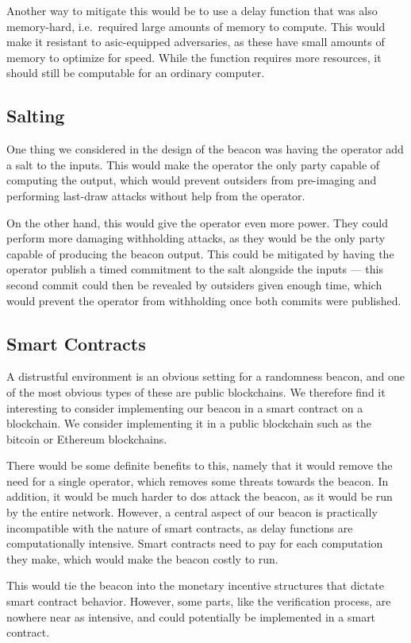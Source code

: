 Another way to mitigate this would be to use a delay function that was also memory-hard, i.e.\ required large amounts of memory to compute.
This would make it resistant to \gls{asic}-equipped adversaries, as these have small amounts of memory to optimize for speed.
While the function requires more resources, it should still be computable for an ordinary computer.

\subsection{Salting}
One thing we considered in the design of the beacon was having the operator add a salt to the inputs.
This would make the operator the only party capable of computing the output, which would prevent outsiders from pre-imaging and performing last-draw attacks without help from the operator.

On the other hand, this would give the operator even more power.
They could perform more damaging withholding attacks, as they would be the only party capable of producing the beacon output.
This could be mitigated by having the operator publish a timed commitment to the salt alongside the inputs --- this second commit could then be revealed by outsiders given enough time, which would prevent the operator from withholding once both commits were published.

\subsection{Smart Contracts}
A distrustful environment is an obvious setting for a randomness beacon, and one of the most obvious types of these are public blockchains.
We therefore find it interesting to consider implementing our beacon in a smart contract on a blockchain. We consider implementing it in a public blockchain such as the bitcoin or Ethereum blockchains.

There would be some definite benefits to this, namely that it would remove the need for a single operator, which removes some threats towards the beacon.
In addition, it would be much harder to \gls{dos} attack the beacon, as it would be run by the entire network.
However, a central aspect of our beacon is practically incompatible with the nature of smart contracts, as delay functions are computationally intensive.
Smart contracts need to pay for each computation they make, which would make the beacon costly to run.

This would tie the beacon into the monetary incentive structures that dictate smart contract behavior.
However, some parts, like the verification process, are nowhere near as intensive, and could potentially be implemented in a smart contract.

